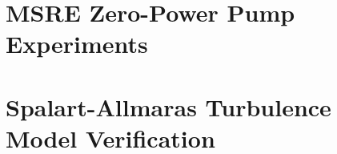 


\section{MSRE Zero-Power Pump Experiments}

\section{Spalart-Allmaras Turbulence Model Verification}


